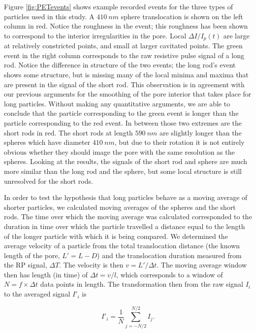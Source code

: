 		
		Figure \ref{fig:PETevents} shows example recorded events for the three types of particles used in this study. A $\SI{410}{nm}$ sphere translocation is shown on the left column in red. Notice the roughness in the event; this roughness has been shown to correspond to the interior irregularities in the pore. Local $\Delta I/I_{p}\left(t\right)$ are large at relatively constricted points, and small at larger cavitated points. The green event in the right column corresponds to the raw resistive pulse signal of a long rod. Notice the difference in structure of the two events; the long rod's event shows some structure, but is missing many of the local minima and maxima that are present in the signal of the short rod. This observation is in agreement with our previous arguments for the smoothing of the pore interior that takes place for long particles. Without making any quantitative arguments, we are able to conclude that the particle corresponding to the green event is longer than the particle corresponding to the red event. In between those two extremes are the short rods in red. The short rods at length $\SI{590}{nm}$ are slightly longer than the spheres which have diameter $\SI{410}{nm}$, but due to their rotation it is not entirely obvious whether they should image the pore with the same resolution as the spheres. Looking at the results, the signals of the short rod and sphere are much more similar than the long rod and the sphere, but some local structure is still unresolved for the short rods. 
		
		In order to test the hypothesis that long particles behave as a moving average of shorter particles, we calculated moving averages of the spheres and the short rods. The time over which the moving average was calculated corresponded to the duration in time over which the particle travelled a distance equal to the length of the longer particle with which it is being compared. We determined the average velocity of a particle from the total translocation distance (the known length of the pore, $L'=L-D$) and the translocation duration measured from the RP signal, $\Delta T$. The velocity is then $v=L'/\Delta t$. The moving average window then has length (in time) of $\Delta t=v/l$, which corresponds to a window of $N=f\times\Delta t$ data points in length. The transformation then from the raw signal $I_{i}$ to the averaged signal $I'_{i}$ is
		
		
		\begin{equation} \label{eq:movingavg}
			I'_{i}=\frac{1}{N}\sum_{j=-N/2}^{N/2}I_{j}.
		\end{equation}
		

